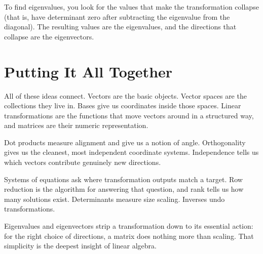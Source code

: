 \documentclass[11pt]{article}
\begin{document}
To find eigenvalues, you look for the values that make the transformation collapse (that is, have determinant zero after subtracting the eigenvalue from the diagonal). The resulting values are the eigenvalues, and the directions that collapse are the eigenvectors.

\section*{Putting It All Together}

All of these ideas connect. Vectors are the basic objects. Vector spaces are the collections they live in. Bases give us coordinates inside those spaces. Linear transformations are the functions that move vectors around in a structured way, and matrices are their numeric representation.

Dot products measure alignment and give us a notion of angle. Orthogonality gives us the cleanest, most independent coordinate systems. Independence tells us which vectors contribute genuinely new directions.

Systems of equations ask where transformation outputs match a target. Row reduction is the algorithm for answering that question, and rank tells us how many solutions exist. Determinants measure size scaling. Inverses undo transformations.

Eigenvalues and eigenvectors strip a transformation down to its essential action: for the right choice of directions, a matrix does nothing more than scaling. That simplicity is the deepest insight of linear algebra.
\end{document}
